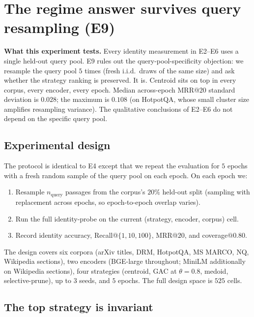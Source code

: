 \section{The regime answer survives query resampling (E9)}
\label{sec:e9}

\begin{intuition}
\textbf{What this experiment tests.} Every identity measurement in
E2--E6 uses a single held-out query pool. E9 rules out the
query-pool-specificity objection: we resample the query pool
$5$ times (fresh i.i.d.\ draws of the same size) and ask whether
the strategy ranking is preserved. It is. Centroid sits on top in
every corpus, every encoder, every epoch. Median across-epoch
MRR@$20$ standard deviation is $0.028$; the maximum is $0.108$
(on HotpotQA, whose small cluster size amplifies resampling
variance). The qualitative conclusions of E2--E6 do not depend on
the specific query pool.
\end{intuition}

\subsection{Experimental design}
\label{sec:e9:design}

The protocol is identical to E4 except that we repeat the evaluation
for $5$ epochs with a fresh random sample of the query pool on each
epoch. On each epoch we:

\begin{enumerate}[leftmargin=1.8em, itemsep=2pt]
\item Resample $n_{\mathrm{query}}$ passages from the corpus's
$20\%$ held-out split (sampling with replacement across epochs, so
epoch-to-epoch overlap varies).
\item Run the full identity-probe on the current (strategy,
encoder, corpus) cell.
\item Record identity accuracy, Recall@$\{1, 10, 100\}$, MRR@$20$,
and coverage$@0.80$.
\end{enumerate}

The design covers six corpora (arXiv titles, DRM, HotpotQA, MS MARCO,
NQ, Wikipedia sections), two encoders (BGE-large throughout; MiniLM
additionally on Wikipedia sections), four strategies (centroid, GAC
at $\theta = 0.8$, medoid, selective-prune), up to $3$ seeds, and
$5$ epochs. The full design space is $525$ cells.

\subsection{The top strategy is invariant}
\label{sec:e9:top-invariant}

